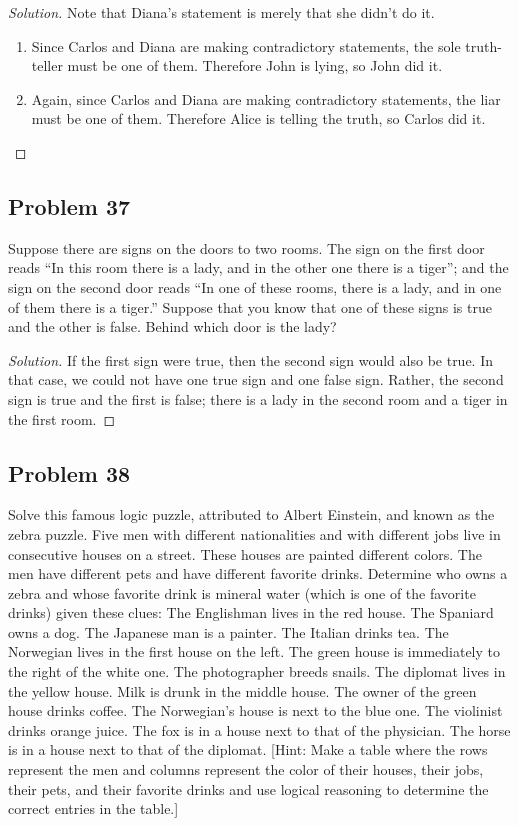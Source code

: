 \documentclass{article}
\newenvironment{solution}{\renewcommand\qedsymbol{}\begin{proof}[Solution]}{\end{proof}}
\begin{document}
\begin{solution}
Note that Diana’s statement is merely that she didn’t do it.

\begin{enumerate}[leftmargin=16pt, topsep = 8pt]
\item Since Carlos and Diana are making contradictory statements, the sole truth-teller must be one of them. Therefore John is lying, so John did it.
\item Again, since Carlos and Diana are making contradictory statements, the liar must be one of them. Therefore Alice is telling the truth, so Carlos did it.
\end{enumerate}
\end{solution}

\clearpage
\subsection*{Problem 37}
Suppose there are signs on the doors to two rooms. The sign on the first door reads “In this room there is a lady, and in the other one there is a tiger”; and the sign on the second door reads “In one of these rooms, there is a lady, and in one of them there is a tiger.” Suppose that you know that one of these signs is true and the other is false. Behind which door is the lady?

\begin{solution}
If the first sign were true, then the second sign would also be true. In that case, we could not have one true sign and one false sign. Rather, the second sign is true and the first is false; there is a lady in the second room and a tiger in the first room.
\end{solution}
\subsection*{Problem 38}
Solve this famous logic puzzle, attributed to Albert Einstein, and known as the zebra puzzle. Five men with different nationalities and with different jobs live in consecutive houses on a street. These houses are painted different colors. The men have different pets and have different favorite drinks. Determine who owns a zebra and whose favorite drink is mineral water (which is one of the favorite drinks) given these clues: The Englishman lives in the red house. The Spaniard owns a dog. The Japanese man is a painter. The Italian drinks tea. The Norwegian lives in the first house on the left. The green house is immediately to the right of the white one. The photographer breeds snails. The diplomat lives in the yellow house. Milk is drunk in the middle house. The owner of the green house drinks coffee. The Norwegian’s house is next to the blue one. The violinist drinks orange juice. The fox is in a house next to that of the physician. The horse is in a house next to that of the diplomat. [Hint: Make a table where the rows represent the men and columns represent the color of their houses, their jobs, their pets, and their favorite drinks and use logical reasoning to determine the correct entries in the table.]
\end{document}
